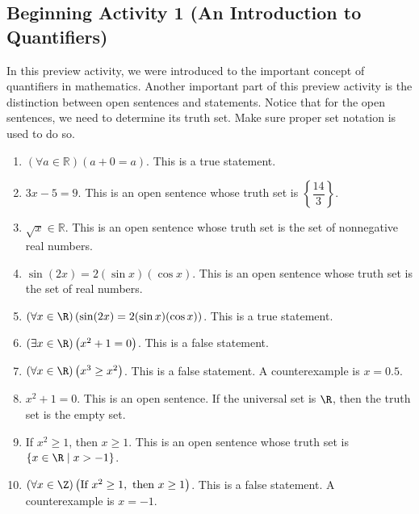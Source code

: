 \documentclass[11pt]{article}
\begin{document}
\subsection*{Beginning Activity 1 (An Introduction to Quantifiers)}
In this preview activity, we were introduced to the important concept of quantifiers in mathematics.  Another important part of this preview activity is the distinction between open sentences and statements.  Notice that for the open sentences, we need to determine its truth set.  Make sure proper set notation is used to do so.
\begin{enumerate}
    \item $\left( \forall a \in \mathbb{R}\right) \left(a + 0 = a\right)$.  This is a true statement.
    \item $3x - 5 = 9$.  This is an open sentence whose truth set is $\left\{ \dfrac{14}{3} \right\}$.
    \item $\sqrt x  \in \mathbb{R}$.  This is an open sentence whose truth set is the set of nonnegative real numbers.
    \item $\sin( {2x} ) = 2( {\sin x} )( {\cos x})$.  This is an open sentence whose truth set is the set of real numbers.
    \item $\left( \forall x \in \R\right) \left(\sin( {2x} ) = 2( {\sin x})( {\cos x}) \right)$.  This is a true statement.
    \item $\left( \exists x \in \R \right)\left( x^2  + 1 = 0 \right)$.  This is a false statement.
    \item $\left( \forall x \in \R \right) \left( x^3  \geq x^2 \right)$.  This is a false statement.  A counterexample is $x = 0.5$.
    \item $x^2  + 1 = 0$.  This is an open sentence.  If the universal set is $\R$, then the truth set is the empty set.
    \item If  $x^2 \geq 1$, then  $x  \geq 1$.  This is an open sentence whose truth set is 
$\left\{ x \in \R \mid x > -1 \right\}$.
    \item $\left( \forall x \in \Z \right)\left( \text{If } x^2 \geq 1, \text{ then } x \geq 1 \right)$.  This is a false statement.  A counterexample is $x = -1$.
\end{enumerate}
\hbreak


\newpage
\end{document}
